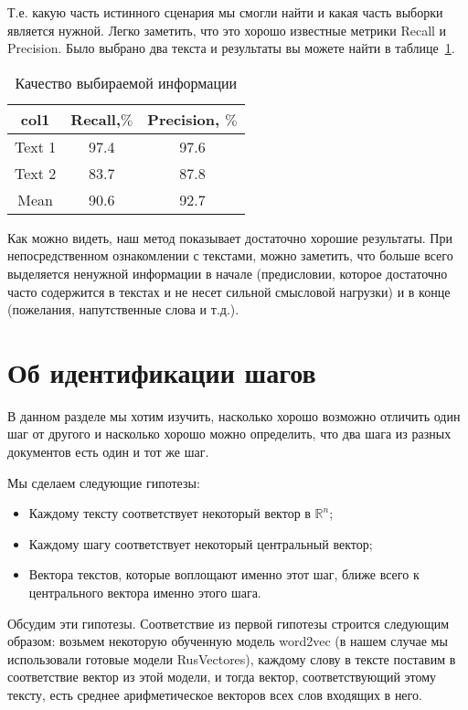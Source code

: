 \documentclass[12pt]{article}
\begin{document}
Т.е. какую часть истинного сценария мы смогли найти и какая часть выборки является нужной. Легко заметить, что это хорошо известные метрики Recall и Precision. Было выбрано два текста и результаты вы можете найти в таблице~\ref{table:1}.

\begin{table}[h!]
\centering
\begin{tabular}{||c |c |c||} 
 \hline
  col1& Recall,$\%$ & Precision, $\%$\\
 \hline
 Text 1 &  97.4&  97.6\\ 
 Text 2 &  83.7&  87.8\\
 \hline
 Mean & 90.6& 92.7\\
 \hline
\end{tabular}
\caption{Качество выбираемой информации}
\label{table:1}
\end{table}

Как можно видеть, наш метод показывает достаточно хорошие результаты. При непосредственном ознакомлении с текстами, можно заметить, что больше всего выделяется ненужной информации в начале (предисловии, которое достаточно часто содержится в текстах и не несет сильной смысловой нагрузки) и в конце (пожелания, напутственные слова и т.д.).

\section{Об идентификации шагов}

В данном разделе мы хотим изучить, насколько хорошо возможно отличить один шаг от другого и насколько хорошо можно определить, что два шага из разных документов есть один и тот же шаг. 

Мы сделаем следующие гипотезы:
\begin{itemize}
	\item Каждому тексту соответствует некоторый вектор в $\mathbb{R}^n$;
	\item Каждому шагу соответствует некоторый центральный вектор;
	\item Вектора текстов, которые воплощают именно этот шаг, ближе всего к центрального вектора именно этого шага.
\end{itemize}

Обсудим эти гипотезы. Соответствие из первой гипотезы строится следующим образом: возьмем некоторую обученную модель word2vec (в нашем случае мы использовали готовые модели RusVectores), каждому слову в тексте поставим в соответствие вектор из этой модели, и тогда вектор, соответствующий этому тексту, есть среднее арифметическое векторов всех слов входящих в него.
\end{document}
